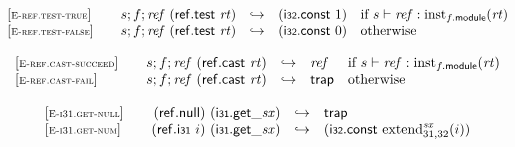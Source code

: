 \vspace{1ex}

$$
\begin{array}[t]{@{}lrcl@{}l@{}}
{[\textsc{\scriptsize E{-}ref.test{-}true}]} \quad & s ; f ; {\mathit{ref}}~(\mathsf{ref{.}test}~{\mathit{rt}}) & \hookrightarrow & (\mathsf{i{\scriptstyle 32}}{.}\mathsf{const}~1) & \quad \mbox{if}~ s \vdash {\mathit{ref}} : {{\mathrm{inst}}}_{f{.}\mathsf{module}}({\mathit{rt}}) \\
{[\textsc{\scriptsize E{-}ref.test{-}false}]} \quad & s ; f ; {\mathit{ref}}~(\mathsf{ref{.}test}~{\mathit{rt}}) & \hookrightarrow & (\mathsf{i{\scriptstyle 32}}{.}\mathsf{const}~0) & \quad \mbox{otherwise} \\
\end{array}
$$

\vspace{1ex}

$$
\begin{array}[t]{@{}lrcl@{}l@{}}
{[\textsc{\scriptsize E{-}ref.cast{-}succeed}]} \quad & s ; f ; {\mathit{ref}}~(\mathsf{ref{.}cast}~{\mathit{rt}}) & \hookrightarrow & {\mathit{ref}} & \quad \mbox{if}~ s \vdash {\mathit{ref}} : {{\mathrm{inst}}}_{f{.}\mathsf{module}}({\mathit{rt}}) \\
{[\textsc{\scriptsize E{-}ref.cast{-}fail}]} \quad & s ; f ; {\mathit{ref}}~(\mathsf{ref{.}cast}~{\mathit{rt}}) & \hookrightarrow & \mathsf{trap} & \quad \mbox{otherwise} \\
\end{array}
$$

\vspace{1ex}

$$
\begin{array}[t]{@{}lrcl@{}l@{}}
{[\textsc{\scriptsize E{-}i31.get{-}null}]} \quad & (\mathsf{ref{.}null})~({\mathsf{i{\scriptstyle 31}{.}get}}{\mathsf{\_}}{{\mathit{sx}}}) & \hookrightarrow & \mathsf{trap} \\
{[\textsc{\scriptsize E{-}i31.get{-}num}]} \quad & (\mathsf{ref{.}i{\scriptstyle 31}}~i)~({\mathsf{i{\scriptstyle 31}{.}get}}{\mathsf{\_}}{{\mathit{sx}}}) & \hookrightarrow & (\mathsf{i{\scriptstyle 32}}{.}\mathsf{const}~{{{{\mathrm{extend}}}_{31, 32}^{{\mathit{sx}}}}}{(i)}) \\
\end{array}
$$

\vspace{1ex}

